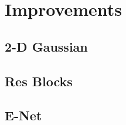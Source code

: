 
\chapter{Improvements}
\label{cha:improvements}
\begin{spacing}{1.5}
\setlength{\parskip}{0.3in}

\section{2-D Gaussian}
\label{sec:IM_2D}

\section{Res Blocks}
\label{sec:IM_resblock}

\section{E-Net}
\label{sec:IM_Enet}



\end{spacing}
\newpage
